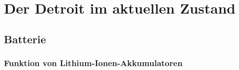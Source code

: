 \chapter{Der Detroit im aktuellen Zustand}

\section{Batterie}

\subsection{Funktion von Lithium-Ionen-Akkumulatoren}